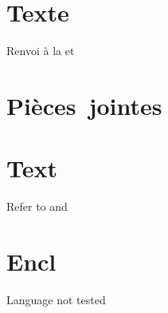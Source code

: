 \documentclass{report}
\begin{document}
\tableofcontents

{
  \part{Texte}
  Renvoi à la  et 
  \part{Pièces~jointes}
}{
  {
    \part{Text}
    Refer to  and 
    \part{Encl}
  }
  {Language not tested}
}

\clearpage
{}


\end{document}
